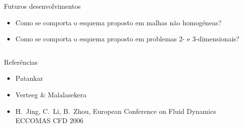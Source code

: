 \documentclass[final,t]{beamer}
\begin{document}
\begin{frame}{}
\begin{columns}[t]
\begin{column}{0.488\linewidth}
\begin{exampleblock}{Futuros desenvolvimentos}
\begin{itemize}
                \item Como se comporta o esquema proposto em malhas não
                    homogéneas?
                \item Como se comporta o esquema proposto em problemas 2- e
                    3-dimen\-sionais?
            \end{itemize}
            \strut
        \end{exampleblock}
    \end{column}
\end{columns}
\begin{columns}[t]
    \begin{column}{\linewidth}
        \small
        \begin{block}{Referências}
            \begin{itemize}
                \item Patankar
                \item Verteeg \& Malalasekera
                \item H.~Jing, C.~Li, B.~Zhou, European Conference on Fluid Dynamics
                    ECCOMAS CFD 2006
            \end{itemize}
        \end{block}
    \end{column}
\end{columns}
\end{frame}
\end{document}
